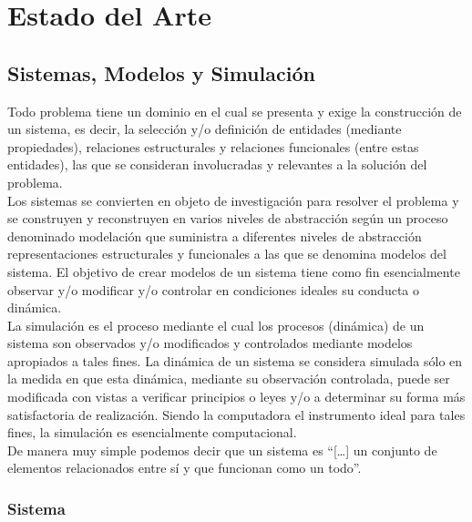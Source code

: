 \chapter{Estado del Arte}\label{chapter:state-of-the-art}

\section{Sistemas, Modelos y Simulación}

Todo problema tiene un dominio en el cual se presenta y exige la construcción de un sistema, es decir, la selección y/o definición de entidades (mediante propiedades), relaciones estructurales y relaciones funcionales (entre estas entidades), las que se consideran involucradas y relevantes a la solución del problema. \parencite{temasdesimulacion} \\

Los sistemas se convierten en objeto de investigación para resolver el problema y se construyen y reconstruyen en varios niveles de abstracción según un proceso denominado modelación que suministra a diferentes niveles de abstracción representaciones estructurales y funcionales a las que se denomina modelos del sistema. El objetivo de crear modelos de un sistema tiene como fin esencialmente observar y/o modificar y/o controlar en condiciones ideales su conducta o dinámica. \parencite{temasdesimulacion} \\

La simulación es el proceso mediante el cual los procesos (dinámica) de un sistema son observados y/o modificados y controlados mediante modelos apropiados a tales fines. La dinámica de un sistema se considera simulada sólo en la medida en que esta dinámica, mediante su observación controlada, puede ser modificada con vistas a verificar principios o leyes y/o a determinar su forma más satisfactoria de realización. Siendo la computadora el instrumento ideal para tales fines, la simulación es esencialmente computacional. \parencite{temasdesimulacion} \\

De manera muy simple podemos decir que un sistema es  “[…] un conjunto de elementos relacionados entre sí y que funcionan como un todo”. \parencite{noauthor_simulacion_nodate} \\

\subsection{Sistema}

